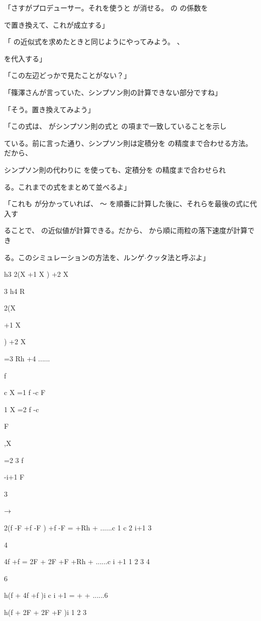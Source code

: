 「さすがプロデューサー。それを使うと が消せる。 の の係数を\par
で置き換えて、これが成⽴する」\par
「 の近似式を求めたときと同じようにやってみよう。 、\par
を代⼊する」\par
「この左辺どっかで⾒たことがない？」\par
「篠澤さんが⾔っていた、シンプソン則の計算できない部分ですね」\par
「そう。置き換えてみよう」\par
「この式は、 がシンプソン則の式と の項まで⼀致していることを⽰し\par
ている。前に⾔った通り、シンプソン則は定積分を の精度まで合わせる⽅法。だから、\par
シンプソン則の代わりに を使っても、定積分を の精度まで合わせられ\par
る。これまでの式をまとめて並べるよ」\par
「これも が分かっていれば、 ～ を順番に計算した後に、それらを最後の式に代⼊す\par
ることで、 の近似値が計算できる。だから、 から順に⾬粒の落下速度が計算でき\par
る。このシミュレーションの⽅法を、ルンゲ$\cdot$クッタ法と呼ぶよ」\par
h3 2(X  +1 X  ) +2 X\par
3 h4 R\par
2(X\par
+1 X\par
) +2 X\par
=3 Rh +4 ......\par
f\par
c X  =1 f  -c F\par
1 X  =2 f  -c\par
F\par
,X\par
=2 3 f\par
-i+1 F\par
3\par
→\par
2(f  -F  +f -F  ) +f  -F  = +Rh + ......c 1 c 2 i+1 3\par
4\par
4f  +f  = 2F  + 2F  +F  +Rh + ......c i +1 1 2 3 4\par
6\par
h(f  + 4f  +f  )i c i +1 =  +  + ......6\par
h(f  + 2F  + 2F  +F  )i 1 2 3\par
